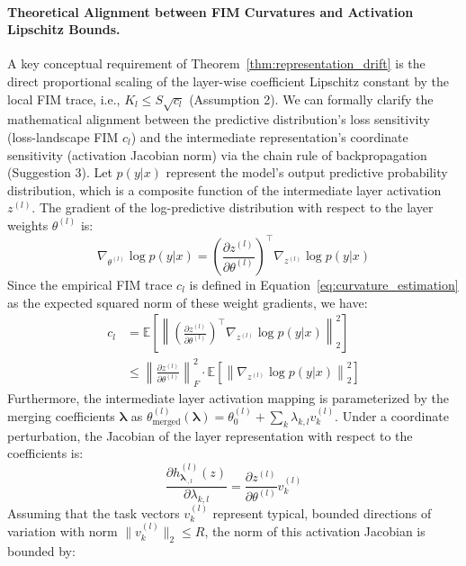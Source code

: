\paragraph{Theoretical Alignment between FIM Curvatures and Activation Lipschitz Bounds.}
\label{para:fim_lipschitz_proof}
A key conceptual requirement of Theorem~\ref{thm:representation_drift} is the direct proportional scaling of the layer-wise coefficient Lipschitz constant by the local FIM trace, i.e., $K_l \le S \sqrt{c_l}$ (Assumption 2). We can formally clarify the mathematical alignment between the predictive distribution's loss sensitivity (loss-landscape FIM $c_l$) and the intermediate representation's coordinate sensitivity (activation Jacobian norm) via the chain rule of backpropagation (Suggestion 3). Let $p(y|x)$ represent the model's output predictive probability distribution, which is a composite function of the intermediate layer activation $z^{(l)}$. The gradient of the log-predictive distribution with respect to the layer weights $\theta^{(l)}$ is:
\begin{equation}
\nabla_{\theta^{(l)}} \log p(y|x) = \left( \frac{\partial z^{(l)}}{\partial \theta^{(l)}} \right)^\top \nabla_{z^{(l)}} \log p(y|x)
\end{equation}
Since the empirical FIM trace $c_l$ is defined in Equation~\ref{eq:curvature_estimation} as the expected squared norm of these weight gradients, we have:
\begin{align}
c_l &= \mathbb{E} \left[ \left\| \left( \frac{\partial z^{(l)}}{\partial \theta^{(l)}} \right)^\top \nabla_{z^{(l)}} \log p(y|x) \right\|_2^2 \right] \nonumber \\
&\le \left\| \frac{\partial z^{(l)}}{\partial \theta^{(l)}} \right\|_F^2 \cdot \mathbb{E} \left[ \left\| \nabla_{z^{(l)}} \log p(y|x) \right\|_2^2 \right]
\end{align}
Furthermore, the intermediate layer activation mapping is parameterized by the merging coefficients $\boldsymbol{\lambda}$ as $\theta_{\text{merged}}^{(l)}(\boldsymbol{\lambda}) = \theta_0^{(l)} + \sum_k \lambda_{k,l} v_k^{(l)}$. Under a coordinate perturbation, the Jacobian of the layer representation with respect to the coefficients is:
\begin{equation}
\frac{\partial h^{(l)}_{\boldsymbol{\lambda}_{\cdot, l}}(z)}{\partial \lambda_{k, l}} = \frac{\partial z^{(l)}}{\partial \theta^{(l)}} v_k^{(l)}
\end{equation}
Assuming that the task vectors $v_k^{(l)}$ represent typical, bounded directions of variation with norm $\|v_k^{(l)}\|_2 \le R$, the norm of this activation Jacobian is bounded by:
